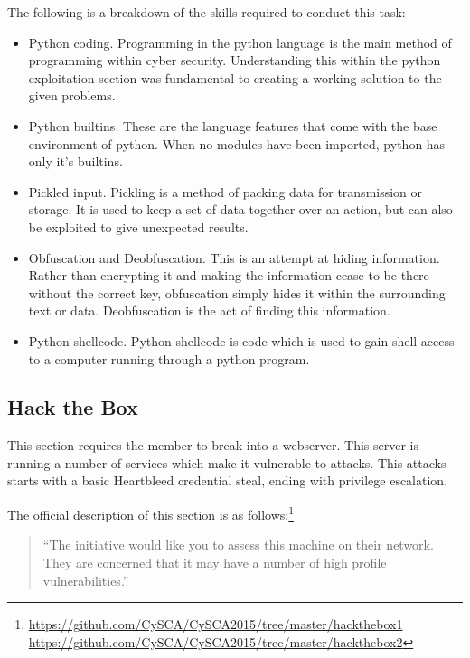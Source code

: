\documentclass[a4paper,11pt]{report}
\begin{document}
			The following is a breakdown of the skills required to conduct this task:
			\begin{itemize}
				\item Python coding.
					Programming in the python language is the main method of programming within cyber security. 
					Understanding this within the python exploitation section was fundamental to creating a working solution to the given problems. 
				\item Python builtins. 
					These are the language features that come with the base environment of python. 
					When no modules have been imported, python has only it's builtins. 
				\item Pickled input. 
					Pickling is a method of packing data for transmission or storage. 
					It is used to keep a set of data together over an action, but can also be exploited to give unexpected results. 
				\item Obfuscation and Deobfuscation. 
					This is an attempt at hiding information. 
					Rather than encrypting it and making the information cease to be there without the correct key, obfuscation simply hides it within the surrounding text or data. 
					Deobfuscation is the act of finding this information.
				\item Python shellcode. 
					Python shellcode is code which is used to gain shell access to a computer running through a python program. 
			\end{itemize}

		\subsection{Hack the Box}
			This section requires the member to break into a webserver. 
			This server is running a number of services which make it vulnerable to attacks. 
			This attacks starts with a basic Heartbleed credential steal, ending with privilege escalation. 

			The official description of this section is as follows:\footnote{\url{https://github.com/CySCA/CySCA2015/tree/master/hackthebox1}\\\qquad\url{https://github.com/CySCA/CySCA2015/tree/master/hackthebox2}} 
			\begin{quote}
				``The initiative would like you to assess this machine on their network. They are concerned that it may have a number of high profile vulnerabilities.''
			\end{quote}
\end{document}
